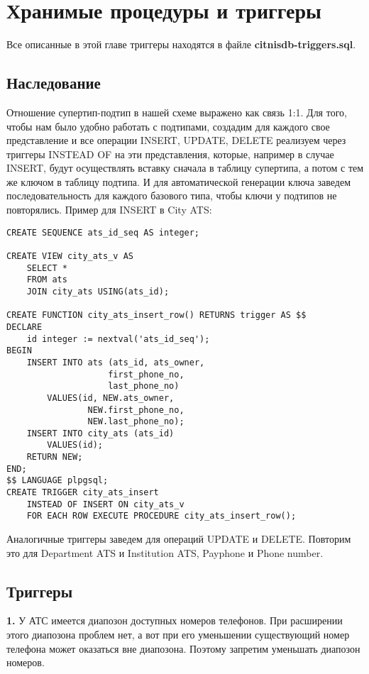 \documentclass{report}
\begin{document}
\chapter{Хранимые процедуры и триггеры}

Все описанные в этой главе триггеры находятся в файле 
\textbf{citnisdb-triggers.sql}.

\section{Наследование}

Отношение супертип-подтип в нашей схеме выражено как связь 1:1. 
Для того, чтобы нам было удобно работать с подтипами, создадим
для каждого свое представление и все операции INSERT, UPDATE, DELETE
реализуем через триггеры INSTEAD OF на эти представления, которые,
например в случае INSERT, будут осуществлять вставку сначала в 
таблицу супертипа, а потом с тем же ключом в таблицу подтипа.
И для автоматической генерации ключа заведем последовательность 
для каждого базового типа, чтобы ключи у подтипов не повторялись.
Пример для INSERT в City ATS:
\begin{lstlisting}
CREATE SEQUENCE ats_id_seq AS integer;

CREATE VIEW city_ats_v AS
    SELECT *
    FROM ats 
    JOIN city_ats USING(ats_id); 

CREATE FUNCTION city_ats_insert_row() RETURNS trigger AS $$
DECLARE
    id integer := nextval('ats_id_seq');
BEGIN
    INSERT INTO ats (ats_id, ats_owner, 
                    first_phone_no, 
                    last_phone_no)
        VALUES(id, NEW.ats_owner, 
                NEW.first_phone_no, 
                NEW.last_phone_no);
    INSERT INTO city_ats (ats_id)
        VALUES(id);
    RETURN NEW;
END;
$$ LANGUAGE plpgsql;
CREATE TRIGGER city_ats_insert 
    INSTEAD OF INSERT ON city_ats_v
    FOR EACH ROW EXECUTE PROCEDURE city_ats_insert_row();
\end{lstlisting}

Аналогичные триггеры заведем для операций UPDATE и DELETE. 
Повторим это для Department ATS и Institution ATS, 
Payphone и Phone number.

\section{Триггеры}

\textbf{1.} У АТС имеется диапозон доступных номеров телефонов. 
При расширении этого диапозона проблем нет, а вот при его 
уменьшении существующий номер телефона может оказаться 
вне диапозона. Поэтому запретим уменьшать диапозон номеров.
\end{document}
